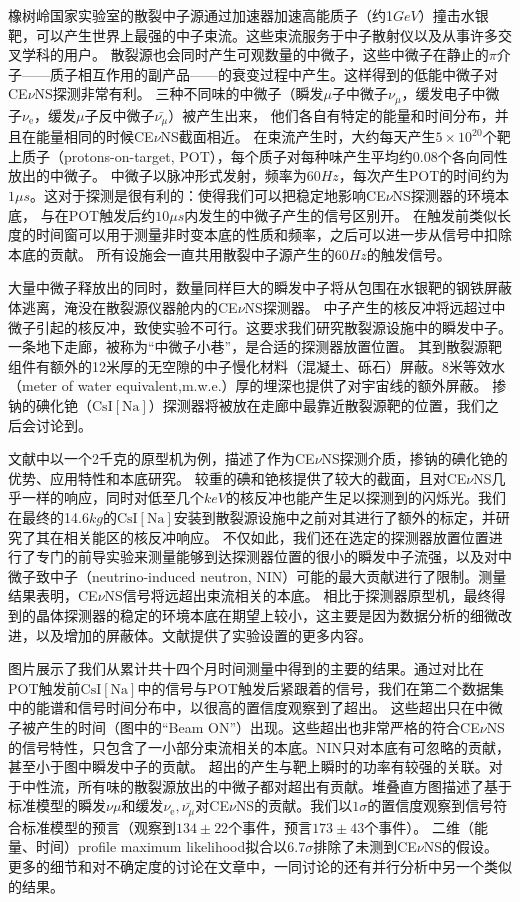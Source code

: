 \begin{translation}
橡树岭国家实验室的散裂中子源通过加速器加速高能质子（约1$\si{GeV}$）撞击水银靶，可以产生世界上最强的中子束流。这些束流服务于中子散射仪以及从事许多交叉学科的用户。
散裂源也会同时产生可观数量的中微子，这些中微子在静止的$\pi$介子——质子相互作用的副产品——的衰变过程中产生。这样得到的低能中微子对CE$\nu$NS探测非常有利。
三种不同味的中微子（瞬发$\mu$子中微子$\nu_\mu$，缓发电子中微子$\nu_\mathrm{e}$，缓发$\mu$子反中微子$\bar{\nu_\mu}$）被产生出来，
他们各自有特定的能量和时间分布，并且在能量相同的时候CE$\nu$NS截面相近。
在束流产生时，大约每天产生$5\times10^{20}$个靶上质子（protons-on-target, POT），每个质子对每种味产生平均约0.08个各向同性放出的中微子。
中微子以脉冲形式发射，频率为$60\si{Hz}$，每次产生POT的时间约为$1\mu\si{s}$。这对于探测是很有利的：使得我们可以把稳定地影响CE$\nu$NS探测器的环境本底，
与在POT触发后约$10\mu\si{s}$内发生的中微子产生的信号区别开。
在触发前类似长度的时间窗可以用于测量非时变本底的性质和频率，之后可以进一步从信号中扣除本底的贡献。
所有设施会一直共用散裂中子源产生的$60\si{Hz}$的触发信号。

大量中微子释放出的同时，数量同样巨大的瞬发中子将从包围在水银靶的钢铁屏蔽体逃离，淹没在散裂源仪器舱内的CE$\nu$NS探测器。
中子产生的核反冲将远超过中微子引起的核反冲，致使实验不可行。这要求我们研究散裂源设施中的瞬发中子。一条地下走廊，被称为``中微子小巷''，是合适的探测器放置位置。
其到散裂源靶组件有额外的12米厚的无空隙的中子慢化材料（混凝土、砾石）屏蔽。8米等效水（meter of water equivalent,m.w.e.）厚的埋深也提供了对宇宙线的额外屏蔽。
掺钠的碘化铯（$\mathrm{CsI[Na]}$）探测器将被放在走廊中最靠近散裂源靶的位置，我们之后会讨论到。

文献中以一个2千克的原型机为例，描述了作为CE$\nu$NS探测介质，掺钠的碘化铯的优势、应用特性和本底研究。
较重的碘和铯核提供了较大的截面，且对CE$\nu$NS几乎一样的响应，同时对低至几个$\si{keV}$的核反冲也能产生足以探测到的闪烁光。我们在最终的14.6$\si{kg}$的$\mathrm{CsI[Na]}$安装到散裂源设施中之前对其进行了额外的标定，并研究了其在相关能区的核反冲响应。
不仅如此，我们还在选定的探测器放置位置进行了专门的前导实验来测量能够到达探测器位置的很小的瞬发中子流强，以及对中微子致中子（neutrino-induced neutron, NIN）可能的最大贡献进行了限制。测量结果表明，CE$\nu$NS信号将远超出束流相关的本底。
相比于探测器原型机，最终得到的晶体探测器的稳定的环境本底在期望上较小，这主要是因为数据分析的细微改进，以及增加的屏蔽体。文献提供了实验设置的更多内容。

图片展示了我们从累计共十四个月时间测量中得到的主要的结果。通过对比在POT触发前$\mathrm{CsI[Na]}$中的信号与POT触发后紧跟着的信号，我们在第二个数据集中的能谱和信号时间分布中，以很高的置信度观察到了超出。
这些超出只在中微子被产生的时间（图中的``Beam ON''）出现。这些超出也非常严格的符合CE$\nu$NS的信号特性，只包含了一小部分束流相关的本底。NIN只对本底有可忽略的贡献，甚至小于图中瞬发中子的贡献。
超出的产生与靶上瞬时的功率有较强的关联。对于中性流，所有味的散裂源放出的中微子都对超出有贡献。堆叠直方图描述了基于标准模型的瞬发$\nu\mu$和缓发$\nu_\mathrm{e},\bar{\nu_\mu}$对CE$\nu$NS的贡献。我们以$1\sigma$的置信度观察到信号符合标准模型的预言（观察到$134\pm22$个事件，预言$173\pm43$个事件）。
二维（能量、时间）profile maximum likelihood拟合以$6.7\sigma$排除了未测到CE$\nu$NS的假设。更多的细节和对不确定度的讨论在文章中，一同讨论的还有并行分析中另一个类似的结果。


\end{translation}
